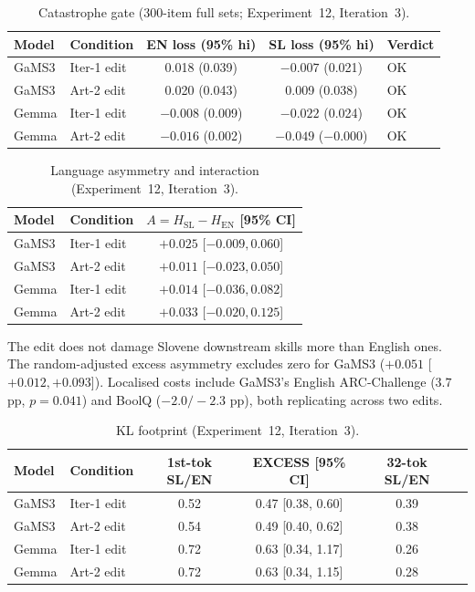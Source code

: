 \documentclass[11pt,letterpaper]{article}
\begin{document}
\begin{table}[!htbp]
\centering
\caption{Catastrophe gate (300-item full sets; Experiment~12, Iteration~3).}
\label{tab:catastrophe_exp12}
\begin{tabular}{llccl}
\toprule
Model & Condition & EN loss (95\% hi) & SL loss (95\% hi) & Verdict \\
\midrule
GaMS3 & Iter-1 edit & 0.018 (0.039) & $-0.007$ (0.021) & OK \\
GaMS3 & Art-2 edit & 0.020 (0.043) & 0.009 (0.038) & OK \\
Gemma & Iter-1 edit & $-0.008$ (0.009) & $-0.022$ (0.024) & OK \\
Gemma & Art-2 edit & $-0.016$ (0.002) & $-0.049$ ($-0.000$) & OK \\
\bottomrule
\end{tabular}
\end{table}

\begin{table}[!htbp]
\centering
\caption{Language asymmetry and interaction (Experiment~12, Iteration~3).}
\label{tab:asymmetry_exp12}
\begin{tabular}{llc}
\toprule
Model & Condition & $A = H_{\text{SL}} - H_{\text{EN}}$ [95\% CI] \\
\midrule
GaMS3 & Iter-1 edit & $+0.025$ [$-0.009, 0.060$] \\
GaMS3 & Art-2 edit & $+0.011$ [$-0.023, 0.050$] \\
Gemma & Iter-1 edit & $+0.014$ [$-0.036, 0.082$] \\
Gemma & Art-2 edit & $+0.033$ [$-0.020, 0.125$] \\
\bottomrule
\end{tabular}
\end{table}

The edit does not damage Slovene downstream skills more than English ones. The random-adjusted excess asymmetry excludes zero for GaMS3 ($+0.051$ [$+0.012, +0.093$]). Localised costs include GaMS3's English ARC-Challenge ($3.7$ pp, $p = 0.041$) and BoolQ ($-2.0/-2.3$ pp), both replicating across two edits.

\begin{table}[!htbp]
\centering
\caption{KL footprint (Experiment~12, Iteration~3).}
\label{tab:kl_exp12}
{\small
\begin{tabular}{llcccc}
\toprule
Model & Condition & 1st-tok SL/EN & EXCESS [95\% CI] & 32-tok SL/EN \\
\midrule
GaMS3 & Iter-1 edit & 0.52 & 0.47 [0.38, 0.60] & 0.39 \\
GaMS3 & Art-2 edit & 0.54 & 0.49 [0.40, 0.62] & 0.38 \\
Gemma & Iter-1 edit & 0.72 & 0.63 [0.34, 1.17] & 0.26 \\
Gemma & Art-2 edit & 0.72 & 0.63 [0.34, 1.15] & 0.28 \\
\bottomrule
\end{tabular}
}
\end{table}
\end{document}
